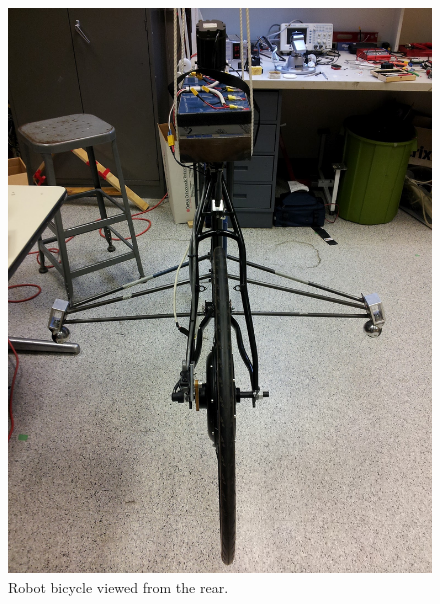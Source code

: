 \begin{figure}[h]
  \centering
  \includegraphics[width=\textwidth,angle=-90]{images/IMG_20120928_153405.jpg}
  \caption{Robot bicycle viewed from the rear.}
  \label{rb:img:rear}
\end{figure}
